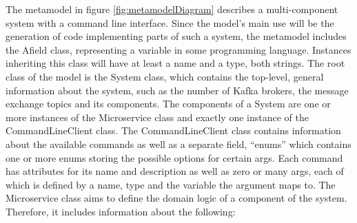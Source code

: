 \documentclass[parskip=full]{article}
\begin{document}
    The metamodel in figure \ref{fig:metamodelDiagram} describes a multi-component system with a command line interface.
    Since the model's main use will be the generation of code implementing parts of such a system, the metamodel includes the Afield class, representing a variable in some programming language.
    Instances inheriting this class will have at least a name and a type, both strings.
    The root class of the model is the System class, which contains the top-level, general information about the system, such as the number of Kafka brokers, the message exchange topics and its components.
    The components of a System are one or more instances of the Microservice class and exactly one instance of the CommandLineClient class.
    The CommandLineClient class contains information about the available commands as well as a separate field,  ``enums'' which contains one or more enums storing the possible options for certain args.
    Each command has attributes for its name and description as well as zero or many args, each of which is defined by a name, type and the variable the argument maps to.
    The Microservice class aims to define the domain logic of a component of the system.
    Therefore, it includes information about the following:
\end{document}
